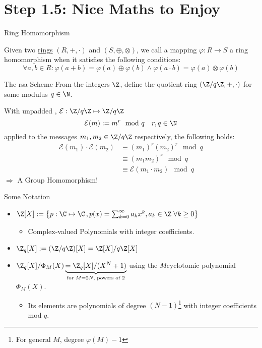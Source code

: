 \section{Step 1.5: Nice Maths to Enjoy}

\begin{frame}{Ring Homomorphism}
  \begin{definition}
    Given two \hyperref[def:ring]{rings} $(R, +, \cdot)$ and $(S, \oplus, \otimes)$, we call a mapping $\varphi: R \rightarrow S$ a ring homomorphism when it satisfies the following conditions:
    $$\forall a, b \in R: \varphi(a + b) = \varphi(a) \oplus \varphi(b) \wedge \varphi(a \cdot b) = \varphi(a) \otimes \varphi(b)$$
  \end{definition}
\end{frame}

\begin{frame}{The \gls{rsa} Scheme}
  From the integers $\Z$, define the quotient ring $(\Z/q\Z, +, \cdot)$ for some modulus $q \in \N$.

  With unpadded  \parencite{1983-rsa}, $\mathcal{E}: \Z/q\Z \mapsto \Z/q\Z$
  $$\mathcal{E}(m) := m^r \mod q \quad r, q \in \N$$
  applied to the messages $m_1, m_2 \in \Z/q\Z$ respectively, the following holds:
  \begin{align*}
    \mathcal{E}(m_1) \cdot \mathcal{E}(m_2)
     & \equiv (m_1)^r (m_2)^r \mod q            \\
     & \equiv (m_1 m_2)^r \mod q                \\
     & \equiv \mathcal{E}(m_1 \cdot m_2) \mod q
  \end{align*}
  $\Rightarrow$ A Group Homomorphism!
\end{frame}

\begin{frame}{Some Notation}
  \begin{itemize}
    \item $\Z[X] := \big\{p: \C \mapsto \C \,, p(x) = \sum_{k=0}^\infty a_k x^k, a_k \in \Z \;\forall k \geq 0\big\}$
          \begin{itemize}
            \item Complex-valued Polynomials with integer coefficients.
          \end{itemize}
    \item $\Z_q[X] := (\Z/q\Z)[X] = \Z[X] / q\Z[X]$
    \item $\Z_q[X] / \Phi_M(X) \underbrace{ = \Z_q[X]/(X^N+1)}_{\text{for } M=2N, \text{ powers of 2}}$ using the $M$\th cyclotomic polynomial $\Phi_M(X)$.
          \begin{itemize}
            \item Its elements are polynomials of degree $(N-1)$\footnote{For general $M$, degree $\varphi(M) - 1$} with integer coefficients mod $q$.
          \end{itemize}
  \end{itemize}
\end{frame}

